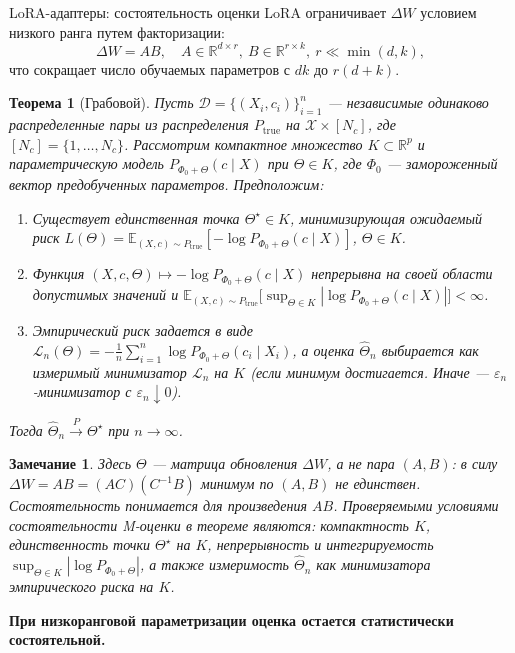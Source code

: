 \documentclass[9pt,pdf,hyperref={unicode}]{beamer}
\newtheorem{rustheorem}{Теорема}
\newtheorem{rusremark}{Замечание}
\newcommand{\key}[1]{\par\vspace{0.5ex}\noindent\textbf{\color{darkgreen}#1}}
\begin{document}
\begin{frame}{LoRA-адаптеры: состоятельность оценки}
\justifying
\footnotesize
LoRA ограничивает $\Delta W$ условием низкого ранга путем факторизации:
\[
    \Delta W = A B, \quad A \in \mathbb{R}^{d \times r}, \ B \in \mathbb{R}^{r \times k}, \ r \ll \min(d,k),
\]
что сокращает число обучаемых параметров с $dk$ до $r(d+k)$.
\begin{rustheorem}[Грабовой]
    Пусть $\mathcal{D} = \{(X_i, c_i)\}_{i=1}^n$ --- независимые одинаково распределенные пары из распределения $P_{\mathrm{true}}$ на $\mathcal{X}\times[N_c]$, где $[N_c]=\{1,\ldots,N_c\}$. Рассмотрим компактное множество $K\subset\mathbb{R}^p$ и параметрическую модель $P_{\Phi_0+\Theta}(c\mid X)$ при $\Theta\in K$, где $\Phi_0$ --- замороженный вектор предобученных параметров. Предположим:
    \begin{enumerate}
        \item Существует единственная точка $\Theta^\star\in K$, минимизирующая ожидаемый риск $L(\Theta)=\mathbb{E}_{(X,c)\sim P_{\mathrm{true}}}[-\log P_{\Phi_0+\Theta}(c\mid X)]$, $\Theta\in K$.
        \item Функция $(X,c,\Theta)\mapsto-\log P_{\Phi_0+\Theta}(c\mid X)$ непрерывна на своей области допустимых значений и $\mathbb{E}_{(X,c)\sim P_{\mathrm{true}}}\bigl[\sup_{\Theta\in K}|\log P_{\Phi_0+\Theta}(c\mid X)|\bigr]<\infty$.
        \item Эмпирический риск задается в виде $\mathscr{L}_n(\Theta)=-\frac{1}{n}\sum_{i=1}^{n}\log P_{\Phi_0+\Theta}(c_i\mid X_i)$, а оценка $\widehat{\Theta}_n$ выбирается как измеримый минимизатор $\mathscr{L}_n$ на $K$ (если минимум достигается. Иначе --- $\varepsilon_n$-минимизатор с $\varepsilon_n\downarrow0$).
    \end{enumerate}
    Тогда $\widehat{\Theta}_n \xrightarrow{P} \Theta^\star$ при $n\to\infty$.
\end{rustheorem}
\begin{rusremark}
    Здесь $\Theta$ --- матрица обновления $\Delta W$, а не пара $(A,B)$: в силу $\Delta W=AB=(AC)(C^{-1}B)$ минимум по $(A,B)$ не единствен. Состоятельность понимается для произведения $AB$. Проверяемыми условиями состоятельности M-оценки в теореме являются: компактность $K$, единственность точки $\Theta^\star$ на $K$, непрерывность и интегрируемость $\sup_{\Theta\in K}|\log P_{\Phi_0+\Theta}|$, а также измеримость $\widehat{\Theta}_n$ как минимизатора эмпирического риска на $K$.
\end{rusremark}
\key{При низкоранговой параметризации оценка остается статистически состоятельной.}
\end{frame}
\end{document}
